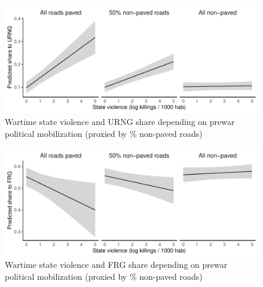 \documentclass[12pt, notitlepage]{article}
\begin{document}
\begin{figure}[htb!]
  \centering
    \includegraphics[width = .75\textwidth]{img/pp_URNG_roads}

  \caption{Wartime state violence and URNG share depending on prewar political mobilization (proxied by \% non-paved roads)} \label{fig:pp_URNG_roads}


\end{figure}

\begin{figure}[htb!]
  \centering
    \includegraphics[width = .75\textwidth]{img/pp_FRG_roads}

  \caption{Wartime state violence and FRG share depending on prewar political mobilization (proxied by \% non-paved roads)} \label{fig:pp_FRG_roads}


\end{figure}
\end{document}
